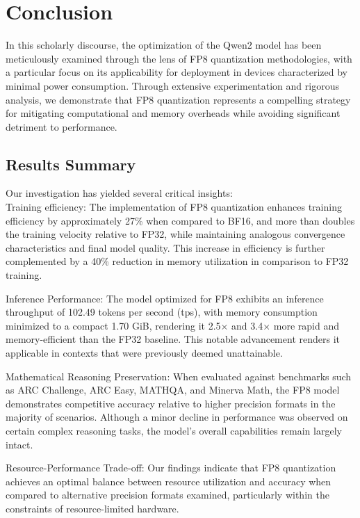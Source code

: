 \chapter*{Conclusion} 

In this scholarly discourse, the optimization of the Qwen2 model has been meticulously examined through the lens of FP8 quantization methodologies, with a particular focus on its applicability for deployment in devices characterized by minimal power consumption. Through extensive experimentation and rigorous analysis, we demonstrate that FP8 quantization represents a compelling strategy for mitigating computational and memory overheads while avoiding significant detriment to performance.

\section*{Results Summary} Our investigation has yielded several critical insights:\\ Training efficiency: The implementation of FP8 quantization enhances training efficiency by approximately 27\% when compared to BF16, and more than doubles the training velocity relative to FP32, while maintaining analogous convergence characteristics and final model quality. This increase in efficiency is further complemented by a 40\% reduction in memory utilization in comparison to FP32 training.

Inference Performance: The model optimized for FP8 exhibits an inference throughput of 102.49 tokens per second (tps), with memory consumption minimized to a compact 1.70 GiB, rendering it 2.5× and 3.4× more rapid and memory-efficient than the FP32 baseline. This notable advancement renders it applicable in contexts that were previously deemed unattainable.

Mathematical Reasoning Preservation: When evaluated against benchmarks such as ARC Challenge, ARC Easy, MATHQA, and Minerva Math, the FP8 model demonstrates competitive accuracy relative to higher precision formats in the majority of scenarios. Although a minor decline in performance was observed on certain complex reasoning tasks, the model's overall capabilities remain largely intact.

Resource-Performance Trade-off: Our findings indicate that FP8 quantization achieves an optimal balance between resource utilization and accuracy when compared to alternative precision formats examined, particularly within the constraints of resource-limited hardware.

